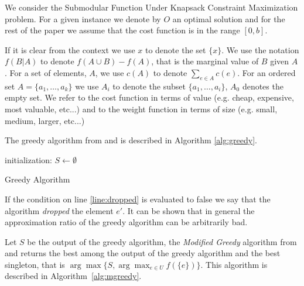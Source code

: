 We consider the Submodular Function Under
Knapsack Constraint Maximization problem.
For a given instance we denote by $O$ an optimal solution and for the rest of the 
paper we assume that the cost function is in the range $[0, b]$.
 
If it is clear from the context we use $x$ to denote the set $\{x\}$. 
We use the notation $f(B|A)$ to denote $f(A \cup B) - f(A)$, that is the marginal value of $B$
given $A$. 
For a set of elements, $A$, we use $c(A)$ to denote $\sum_{e \in A}c(e)$.
For an ordered set $A = \{a_1, \dots, a_k\}$ we use $A_i$ to denote the subset 
$\{a_1, \dots, a_i\}$, $A_0$ denotes the empty set.
We refer to the cost function in terms of value (e.g. cheap, expensive, most valuable, etc...) and 
to the weight function in terms of size (e.g. small, medium, larger, etc...) 

The greedy algorithm from \cite{khuller1999budgeted} and \cite{krause2005note}
is described in Algorithm \ref{alg:greedy}.

\begin{algorithm}[H]
\label{alg:greedy}



initialization: $S \leftarrow \emptyset$
\\
\caption{Greedy Algorithm}
\end{algorithm}
 
If the condition on line \ref{line:dropped} is evaluated to false we say that
the algorithm \emph{dropped} the element $e'$.
It can be shown that in general the approximation ratio of the greedy algorithm 
can be arbitrarily bad.

Let $S$ be the output of the greedy algorithm, the \emph{Modified Greedy} algorithm 
from \cite{khuller1999budgeted} and \cite{krause2005note} 
returns the best among the output of the greedy algorithm and the best singleton, 
that is $\arg\max\{S, \displaystyle{\arg\max_{e \in U}}f(\{e\})\}$.
This algorithm is described in Algorithm~\ref{alg:mgreedy}.  

